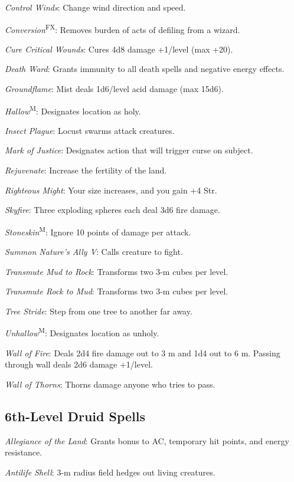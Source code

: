 \textit{Control Winds}: Change wind direction and speed.

\textit{Conversion}\textsuperscript{FX}: Removes burden of acts of defiling from a wizard.

\textit{Cure Critical Wounds}: Cures 4d8 damage +1/level (max +20).

\textit{Death Ward}: Grants immunity to all death spells and negative energy effects.

\textit{Groundflame}: Mist deals 1d6/level acid damage (max 15d6).

\textit{Hallow}\textsuperscript{M}: Designates location as holy.

\textit{Insect Plague}: Locust swarms attack creatures.

\textit{Mark of Justice}: Designates action that will trigger curse on subject.

\textit{Rejuvenate}: Increase the fertility of the land.

\textit{Righteous Might}: Your size increases, and you gain +4 Str.

\textit{Skyfire}: Three exploding spheres each deal 3d6 fire damage.

\textit{Stoneskin}\textsuperscript{M}: Ignore 10 points of damage per attack.

\textit{Summon Nature's Ally V}: Calls creature to fight.

\textit{Transmute Mud to Rock}: Transforms two 3-m cubes per level.

\textit{Transmute Rock to Mud}: Transforms two 3-m cubes per level.

\textit{Tree Stride}: Step from one tree to another far away.

\textit{Unhallow}\textsuperscript{M}: Designates location as unholy.

\textit{Wall of Fire}: Deals 2d4 fire damage out to 3 m and 1d4 out to 6 m. Passing through wall deals 2d6 damage +1/level.

\textit{Wall of Thorns}: Thorns damage anyone who tries to pass.



\subsection{6th-Level Druid Spells}

\textit{Allegiance of the Land}: Grants bonus to AC, temporary hit points, and energy resistance.

\textit{Antilife Shell}: 3-m radius field hedges out living creatures.

